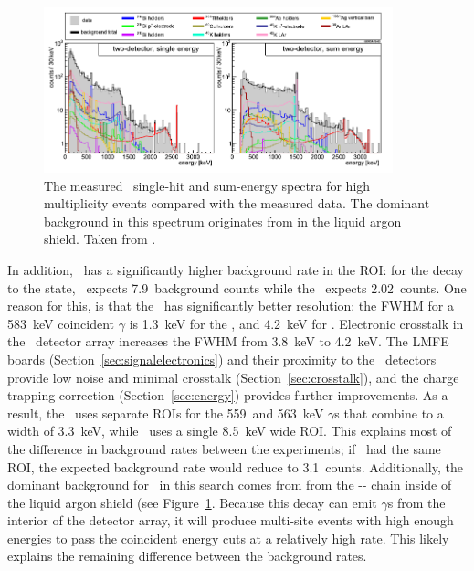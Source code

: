 \documentclass[/main.tex]{subfiles}
\begin{document}
\begin{figure}[h]
  \centering
  \includegraphics[width=0.9\textwidth]{gerdabackgrounds}
  \caption[\Gerda\ multi-site event backgrounds]{\label{gerdabgmodel}
    The measured \Gerda\ single-hit and sum-energy spectra for high multiplicity events compared with the measured data. The dominant background in this spectrum originates from  in the liquid argon shield. Taken from \cite{gerdaESresult}.
  }
\end{figure}
In addition, \Gerda\ has a significantly higher background rate in the ROI: for the decay to the  state, \Gerda\ expects 7.9~background counts while the \MJD\ expects 2.02~counts.
One reason for this, is that the \MJD\ has significantly better resolution: the FWHM for a  583~keV coincident $\gamma$ is 1.3~keV for the \MJD, and 4.2~keV for \Gerda.
Electronic crosstalk in the \Gerda\ detector array increases the FWHM from 3.8~keV to 4.2~keV.
The LMFE boards (Section~\ref{sec:signalelectronics}) and their proximity to the \MJ\ detectors provide low noise and minimal crosstalk (Section~\ref{sec:crosstalk}), and the charge trapping correction (Section~\ref{sec:energy}) provides further improvements.
As a result, the \MJD\ uses separate ROIs for the 559~and 563~keV $\gamma$s that combine to a width of 3.3~keV, while \Gerda\ uses a single 8.5~keV wide ROI.
This explains most of the difference in background rates between the experiments; if \Gerda\ had the same ROI, the expected background rate would reduce to 3.1~counts.
Additionally, the dominant background for \Gerda\ in this search comes from  from the -- chain inside of the liquid argon shield (see Figure~\ref{gerdabgmodel}.
Because this decay can emit $\gamma$s from the interior of the detector array, it will produce multi-site events with high enough energies to pass the coincident energy cuts at a relatively high rate.
This likely explains the remaining difference between the background rates.
\end{document}
